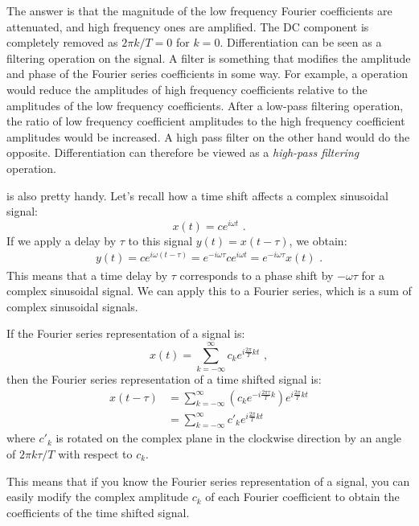The answer is that the magnitude of the low frequency Fourier
coefficients are attenuated, and high frequency ones are
amplified. The DC component is completely removed as $2\pi k/T = 0$
for $k=0$.  Differentiation can be seen as a filtering operation on
the signal. A filter is something that modifies the amplitude and
phase of the Fourier series coefficients in some way.  For example, a
\emph{} operation would reduce the amplitudes of high
frequency coefficients relative to the amplitudes of the low frequency
coefficients.  After a low-pass filtering operation, the ratio of low
frequency coefficient amplitudes to the high frequency coefficient
amplitudes would be increased. A high pass filter on the other hand
would do the opposite. Differentiation can therefore be viewed as
a \emph{high-pass filtering} operation.

 is also pretty handy.
Let's recall how a time shift affects a complex sinusoidal signal:
\begin{equation}
  x(t) = c e^{i\omega t} \,\,.
\end{equation}
If we apply a delay by $\tau$ to this signal $y(t) = x(t-\tau)$, we obtain:
\begin{align}
  y(t)  = c e^{i\omega (t-\tau)} =  e^{-i\omega \tau} c e^{i\omega t} = e^{-i\omega \tau} x(t) \,\,.
\end{align}
This means that a time delay by $\tau$ corresponds to a phase shift by
$-\omega\tau$ for a complex sinusoidal signal.  We can apply this to a
Fourier series, which is a sum of complex sinusoidal signals.

If the Fourier series representation of a signal is:
\begin{equation}
  x(t) = \sum_{k=-\infty}^{\infty} c_k e^{i\frac{2\pi}{T}kt} \,\,,
\end{equation}
then the Fourier series representation of a time shifted signal is:
\begin{align}
  x(t-\tau) & = \sum_{k=-\infty}^{\infty} \left(c_k e^{-i \frac{2\pi \tau}{T} k}\right) e^{i\frac{2\pi}{T}kt}\label{eq:time_shift_phasor} \\
            & =  \sum_{k=-\infty}^{\infty} c'_k e^{i\frac{2\pi}{T}kt}
\end{align}
where $c'_k$ is rotated on the complex plane in the clockwise
direction by an angle of $2\pi k\tau/T$ with respect to $c_k$.

This means that if you know the Fourier series representation of a
signal, you can easily modify the complex amplitude $c_k$ of each
Fourier coefficient to obtain the coefficients of the time shifted
signal.

